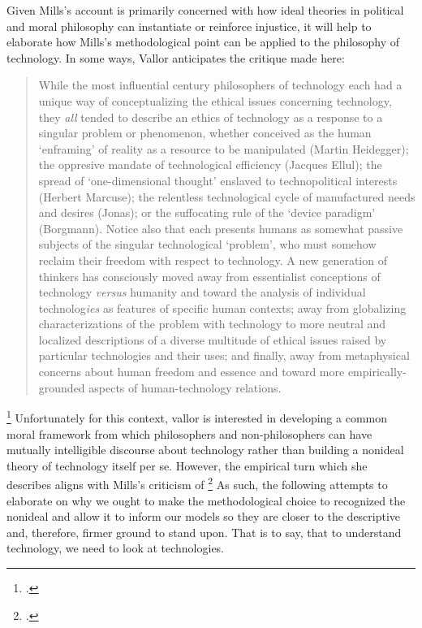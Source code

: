 \documentclass[letterpaper,notitlepage,12pt]{article}
\begin{document}
Given Mills's account is primarily concerned with how  ideal theories in 
political and moral philosophy can instantiate or reinforce injustice, it will
help to elaborate how Mills's methodological point can be applied to the
philosophy of technology.
In some ways, Vallor anticipates the critique made here: \blockquote{While the most influential
  \nth{20]} century philosophers of technology each had a unique way of
  conceptualizing the ethical issues concerning technology, they \textit{all}
  tended to describe an ethics of technology as a response to a singular problem
  or phenomenon, whether conceived as the human `enframing' of reality as a
  resource to be manipulated (Martin Heidegger); the oppresive mandate of
  technological efficiency (Jacques Ellul); the spread of `one-dimensional
  thought' enslaved to technopolitical interests (Herbert Marcuse); the
  relentless technological cycle of manufactured needs and desires (Jonas); or
  the suffocating rule of the `device paradigm' (Borgmann).
  Notice also that each presents humans as somewhat passive
  subjects of the singular technological `problem', who must somehow reclaim
  their freedom with respect to technology. A new generation of thinkers has
  consciously moved away from essentialist conceptions of technology
  \textit{versus} humanity and toward the analysis of individual
  technolog\textit{ies} as features of specific human contexts; away from
  globalizing characterizations of the problem with technology to more neutral
  and localized descriptions of a diverse multitude of ethical issues raised by
  particular technologies and their uses; and finally, away from metaphysical
  concerns about human freedom and essence and toward more empirically-grounded
aspects of human-technology relations.}\footcite[p. 31]{vallor_technology_2018}
Unfortunately for this context, vallor is interested in developing a common
moral framework from which philosophers and non-philosophers can have mutually
intelligible discourse about technology rather than building a nonideal theory
of technology itself per se.
However, the empirical turn which she describes aligns with Mills's criticism of
\footcite[p. 168]{mills_ideal_2005}
As such, the following attempts to elaborate on why we ought to make the
methodological choice to recognized the nonideal and allow it to inform our
models so they are closer to the descriptive and, therefore, firmer ground to
stand upon.
That is to say, that to understand technology, we need to look at technologies.
\end{document}
